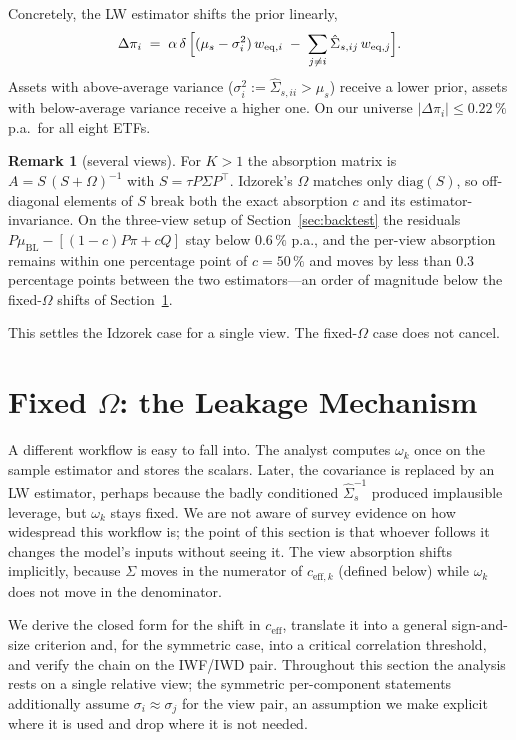 \documentclass[a4paper,11pt]{article}
\theoremstyle{plain}
\theoremstyle{definition}
\newtheorem{remark}[proposition]{Remark}
\newcommand{\Om}{\Omega}
\newcommand{\muBL}{\mu_{\mathrm{BL}}}
\newcommand{\eff}{\mathrm{eff}}
\begin{document}
Concretely, the LW estimator shifts the prior linearly,
\[
  \Delta\pi_i \;=\; \alpha\,\delta\,\Bigl[(\mu_s - \sigma_i^2)\,w_{\mathrm{eq},i}
        \;-\; \sum_{j\neq i}\hat\Sigma_{s,ij}\,w_{\mathrm{eq},j}\Bigr].
\]
Assets with above-average variance ($\sigma_i^2 := \hat\Sigma_{s,ii} >
\mu_s$) receive a lower prior, assets with below-average variance receive
a higher one. On our universe $|\Delta\pi_i| \leq 0.22\,\%$ p.a.\ for all
eight ETFs.

\begin{remark}[several views]\label{rem:multiview}
For $K > 1$ the absorption matrix is $A = S\,(S + \Om)^{-1}$ with
$S = \tau P\Sigma P^\top$. Idzorek's $\Omega$ matches only
$\mathrm{diag}(S)$, so off-diagonal elements of $S$ break both the exact
absorption $c$ and its estimator-invariance. On the three-view setup of
Section~\ref{sec:backtest} the residuals
$P\muBL - [(1-c)P\pi + cQ]$ stay below $0.6\,\%$ p.a., and the per-view
absorption remains within one percentage point of $c = 50\,\%$ and moves
by less than $0.3$ percentage points between the two estimators---an
order of magnitude below the fixed-$\Omega$ shifts of
Section~\ref{sec:fixed-omega}.
\end{remark}

This settles the Idzorek case for a single view. The fixed-$\Omega$ case
does not cancel.

\section{Fixed $\Omega$: the Leakage Mechanism}
\label{sec:fixed-omega}

A different workflow is easy to fall into. The analyst computes
$\omega_k$ once on the sample estimator and stores the scalars. Later,
the covariance is replaced by an LW estimator, perhaps because the badly
conditioned $\hat\Sigma_s^{-1}$ produced implausible leverage, but
$\omega_k$ stays fixed. We are not aware of survey evidence on how
widespread this workflow is; the point of this section is that whoever
follows it changes the model's inputs without seeing it. The view
absorption shifts implicitly, because $\Sigma$ moves in the numerator of
$c_{\eff,k}$ (defined below) while $\omega_k$ does not move in the
denominator.

We derive the closed form for the shift in $c_{\eff}$, translate it into
a general sign-and-size criterion and, for the symmetric case, into a
critical correlation threshold, and verify the chain on the IWF/IWD
pair. Throughout this section the analysis rests on a single relative
view; the symmetric per-component statements additionally assume
$\sigma_i \approx \sigma_j$ for the view pair, an assumption we make
explicit where it is used and drop where it is not needed.
\end{document}
